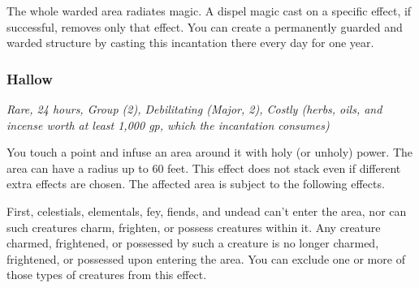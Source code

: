 The whole warded area radiates magic. A dispel magic cast on a specific effect, if successful, removes only that effect. You can create a permanently guarded and warded structure by casting this incantation there every day for one year.

\subsubsection{Hallow} \label{inc:hallow}
\textit{Rare, 24 hours, Group (2), Debilitating (Major, 2), Costly (herbs, oils, and incense worth at least 1,000 gp, which the incantation consumes)}

You touch a point and infuse an area around it with holy (or unholy) power. The area can have a radius up to 60 feet. This effect does not stack even if different extra effects are chosen. The affected area is subject to the following effects.

First, celestials, elementals, fey, fiends, and undead can't enter the area, nor can such creatures charm, frighten, or possess creatures within it. Any creature charmed, frightened, or possessed by such a creature is no longer charmed, frightened, or possessed upon entering the area. You can exclude one or more of those types of creatures from this effect.

